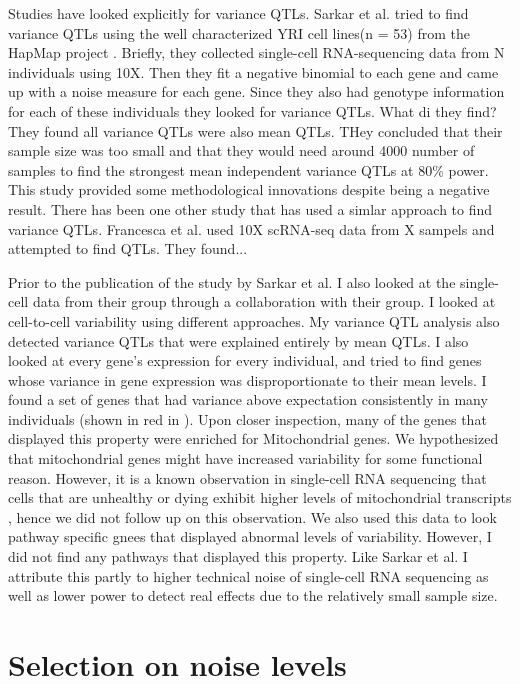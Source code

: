 Studies have looked explicitly for variance QTLs. Sarkar et al. tried to find variance QTLs using the well characterized YRI cell lines(n = 53) from the HapMap project \cite{gibbs2003n}. Briefly, they collected single-cell RNA-sequencing data from N individuals using 10X. Then they fit a negative binomial to each gene and came up with a noise measure for each gene. Since they also had genotype information for each of these individuals they looked for variance QTLs. What di they find? They found all variance QTLs were also mean QTLs. THey concluded that their sample size was too small and that they would need around 4000 number of samples to find the strongest mean independent variance QTLs at 80\% power. This study provided some methodological innovations despite being a negative result. There has been one other study that has used a simlar approach to find variance QTLs. Francesca et al. used 10X scRNA-seq data from X sampels and attempted to find QTLs. They found...

Prior to the publication of the study by Sarkar et al. I also looked at the single-cell data from their group through a collaboration with their group. I looked at cell-to-cell variability using different approaches. My variance QTL analysis also detected variance QTLs that were explained entirely by mean QTLs. I also looked at every gene's expression for every individual, and tried to find genes whose variance in gene expression was disproportionate to their mean levels. I found a set of genes that had variance above expectation consistently in many individuals (shown in red in ). Upon closer inspection, many of the genes that displayed this property were enriched for Mitochondrial genes. We hypothesized that mitochondrial genes might have increased variability for some functional reason. However, it is a known observation in single-cell RNA sequencing that cells that are unhealthy or dying exhibit higher levels of mitochondrial transcripts \cite {stuart2019c}, hence we did not follow up on this observation. We also used this data to look pathway specific gnees that displayed abnormal levels of variability. However, I did not find any pathways that displayed this property. Like Sarkar et al. I attribute this partly to higher technical noise of single-cell RNA sequencing as well as lower power to detect real effects due to the relatively small sample size.

\section{Selection on noise levels}


